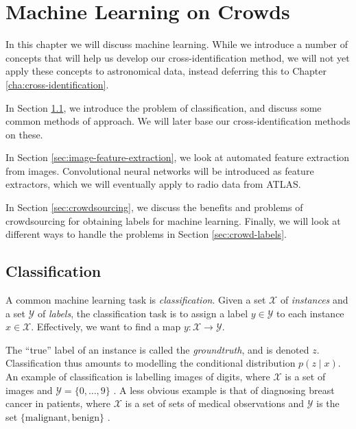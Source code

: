 \chapter{Machine Learning on Crowds}
\label{cha:ml}

In this chapter we will discuss machine learning. While we introduce a number of
concepts that will help us develop our cross-identification method, we will not
yet apply these concepts to astronomical data, instead deferring this to Chapter
\ref{cha:cross-identification}.

In Section \ref{sec:classification}, we introduce the problem of classification,
and discuss some common methods of approach. We will later base our
cross-identification methods on these.

In Section \ref{sec:image-feature-extraction}, we look at automated feature
extraction from images. Convolutional neural networks will be introduced as
feature extractors, which we will eventually apply to radio data from ATLAS.

In Section \ref{sec:crowdsourcing}, we discuss the benefits and problems of
crowdsourcing for obtaining labels for machine learning. Finally, we will look
at different ways to handle the problems in Section \ref{sec:crowd-labels}.

\section{Classification}
\label{sec:classification}

    A common machine learning task is \emph{classification}. Given a set
    $\mathcal X$ of \emph{instances} and a set $\mathcal Y$ of \emph{labels},
    the classification task is to assign a label $y \in \mathcal Y$ to each
    instance $x \in \mathcal X$. Effectively, we want to find a map $y :
    \mathcal X \to \mathcal Y$.

    The ``true'' label of an instance is called the \emph{groundtruth}, and is
    denoted $z$. Classification thus amounts to modelling the conditional
    distribution $p(z \mid x)$. An example of classification is labelling images
    of digits, where $\mathcal X$ is a set of images and $\mathcal Y = \{0,
    \dots, 9\}$ \citep{lecun98}. A less obvious example is that of diagnosing
    breast cancer in patients, where $\mathcal X$ is a set of sets of medical
    observations and $\mathcal Y$ is the set $\{\text{malignant},
    \text{benign}\}$ \citep{wolberg90}.

